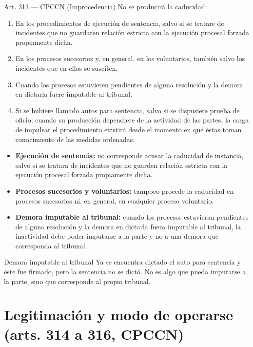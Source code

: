 \documentclass[12pt,oneside]{book}
\begin{document}
\begin{articulo}{Art. 313 --- CPCCN (Improcedencia)}
No se producirá la caducidad:
\begin{enumerate}[label=\arabic*°]
    \item En los procedimientos de ejecución de sentencia, salvo si se tratare de incidentes que no guardaren relación estricta con la ejecución procesal forzada propiamente dicha.
    \item En los procesos sucesorios y, en general, en los voluntarios, también salvo los incidentes que en ellos se susciten.
    \item Cuando los procesos estuvieren pendientes de alguna resolución y la demora en dictarla fuere imputable al tribunal.
    \item Si se hubiere llamado autos para sentencia, salvo si se dispusiere prueba de oficio; cuando su producción dependiere de la actividad de las partes, la carga de impulsar el procedimiento existirá desde el momento en que éstas toman conocimiento de las medidas ordenadas.
\end{enumerate}
\end{articulo}

\begin{itemize}
    \item \textbf{Ejecución de sentencia:} no corresponde acusar la caducidad de instancia, salvo si se tratara de incidentes que no guarden relación estricta con la ejecución procesal forzada propiamente dicha.
    \item \textbf{Procesos sucesorios y voluntarios:} tampoco procede la caducidad en procesos sucesorios ni, en general, en cualquier proceso voluntario.
    \item \textbf{Demora imputable al tribunal:} cuando los procesos estuvieran pendientes de alguna resolución y la demora en dictarla fuera imputable al tribunal, la inactividad debe poder imputarse a la parte y no a una demora que corresponda al tribunal.
\end{itemize}

\begin{example}{Demora imputable al tribunal}
Ya se encuentra dictado el auto para sentencia y éste fue firmado, pero la sentencia no se dictó. No es algo que pueda imputarse a la parte, sino que corresponde al propio tribunal.
\end{example}

\section{Legitimación y modo de operarse (arts. 314 a 316, CPCCN)}
\end{document}

